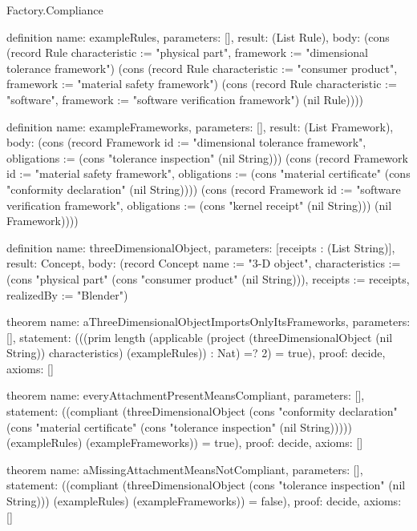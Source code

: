 \begin{lexlean}{Factory.Compliance}
\begin{semanticmodule}
definition{
  name: exampleRules,
  parameters: [],
  result: (List Rule),
  body: (cons (record Rule {characteristic := "physical part", framework := "dimensional tolerance framework"}) (cons (record Rule {characteristic := "consumer product", framework := "material safety framework"}) (cons (record Rule {characteristic := "software", framework := "software verification framework"}) (nil Rule))))
}

definition{
  name: exampleFrameworks,
  parameters: [],
  result: (List Framework),
  body: (cons (record Framework {id := "dimensional tolerance framework", obligations := (cons "tolerance inspection" (nil String))}) (cons (record Framework {id := "material safety framework", obligations := (cons "material certificate" (cons "conformity declaration" (nil String)))}) (cons (record Framework {id := "software verification framework", obligations := (cons "kernel receipt" (nil String))}) (nil Framework))))
}

definition{
  name: threeDimensionalObject,
  parameters: [receipts : (List String)],
  result: Concept,
  body: (record Concept {name := "3-D object", characteristics := (cons "physical part" (cons "consumer product" (nil String))), receipts := receipts, realizedBy := "Blender"})
}

theorem{
  name: aThreeDimensionalObjectImportsOnlyItsFrameworks,
  parameters: [],
  statement: (((prim length (applicable (project (threeDimensionalObject (nil String)) characteristics) (exampleRules)) : Nat) =? 2) = true),
  proof: decide{},
  axioms: []
}

theorem{
  name: everyAttachmentPresentMeansCompliant,
  parameters: [],
  statement: ((compliant (threeDimensionalObject (cons "conformity declaration" (cons "material certificate" (cons "tolerance inspection" (nil String))))) (exampleRules) (exampleFrameworks)) = true),
  proof: decide{},
  axioms: []
}

theorem{
  name: aMissingAttachmentMeansNotCompliant,
  parameters: [],
  statement: ((compliant (threeDimensionalObject (cons "tolerance inspection" (nil String))) (exampleRules) (exampleFrameworks)) = false),
  proof: decide{},
  axioms: []
}
\end{semanticmodule}
\end{lexlean}
